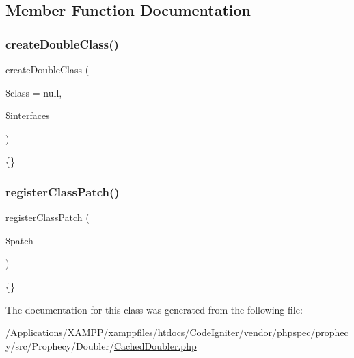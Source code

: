 \subsection{Member Function Documentation}
\mbox{\label{class_prophecy_1_1_doubler_1_1_cached_doubler_a33ece4af76302e33e81acfc979b8ad1d}} 
\subsubsection{\texorpdfstring{create\+Double\+Class()}{createDoubleClass()}}
{\footnotesize\ttfamily create\+Double\+Class (\begin{DoxyParamCaption}\item[{Reflection\+Class}]{\$class = {\ttfamily null},  }\item[{array}]{\$interfaces }\end{DoxyParamCaption})\hspace{0.3cm}{\ttfamily [protected]}}

\{\} \mbox{\label{class_prophecy_1_1_doubler_1_1_cached_doubler_a545eaf98626bca9e5906ab7c5b629e33}} 
\subsubsection{\texorpdfstring{register\+Class\+Patch()}{registerClassPatch()}}
{\footnotesize\ttfamily register\+Class\+Patch (\begin{DoxyParamCaption}\item[{\mbox{\hyperlink{interface_prophecy_1_1_doubler_1_1_class_patch_1_1_class_patch_interface}{Class\+Patch\textbackslash{}\+Class\+Patch\+Interface}}}]{\$patch }\end{DoxyParamCaption})}

\{\} 

The documentation for this class was generated from the following file\+:\begin{DoxyCompactItemize}
\item 
/\+Applications/\+X\+A\+M\+P\+P/xamppfiles/htdocs/\+Code\+Igniter/vendor/phpspec/prophecy/src/\+Prophecy/\+Doubler/\mbox{\hyperlink{_cached_doubler_8php}{Cached\+Doubler.\+php}}\end{DoxyCompactItemize}
